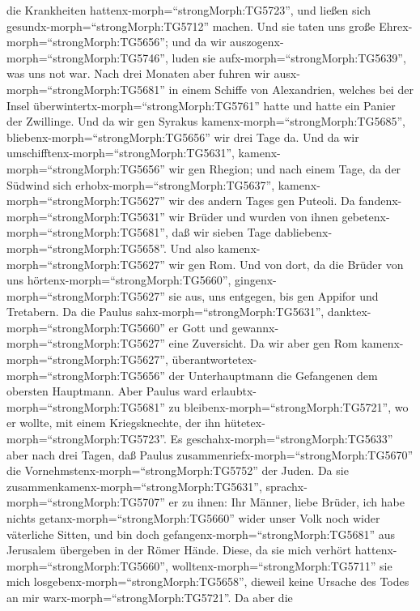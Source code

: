 die Krankheiten hattenx-morph=``strongMorph:TG5723'', und ließen sich
gesundx-morph=``strongMorph:TG5712'' machen.  Und sie taten
uns große Ehrex-morph=``strongMorph:TG5656''; und da wir
auszogenx-morph=``strongMorph:TG5746'', luden sie
aufx-morph=``strongMorph:TG5639'', was uns not war.  Nach
drei Monaten aber fuhren wir ausx-morph=``strongMorph:TG5681'' in einem
Schiffe von Alexandrien, welches bei der Insel
überwintertx-morph=``strongMorph:TG5761'' hatte und hatte ein Panier der
Zwillinge.  Und da wir gen Syrakus
kamenx-morph=``strongMorph:TG5685'',
bliebenx-morph=``strongMorph:TG5656'' wir drei Tage da. 
Und da wir umschifftenx-morph=``strongMorph:TG5631'',
kamenx-morph=``strongMorph:TG5656'' wir gen Rhegion; und nach einem
Tage, da der Südwind sich erhobx-morph=``strongMorph:TG5637'',
kamenx-morph=``strongMorph:TG5627'' wir des andern Tages gen Puteoli.
 Da fandenx-morph=``strongMorph:TG5631'' wir Brüder und
wurden von ihnen gebetenx-morph=``strongMorph:TG5681'', daß wir sieben
Tage dabliebenx-morph=``strongMorph:TG5658''. Und also
kamenx-morph=``strongMorph:TG5627'' wir gen Rom.  Und von
dort, da die Brüder von uns hörtenx-morph=``strongMorph:TG5660'',
gingenx-morph=``strongMorph:TG5627'' sie aus, uns entgegen, bis gen
Appifor und Tretabern. Da die Paulus sahx-morph=``strongMorph:TG5631'',
danktex-morph=``strongMorph:TG5660'' er Gott und
gewannx-morph=``strongMorph:TG5627'' eine Zuversicht.  Da
wir aber gen Rom kamenx-morph=``strongMorph:TG5627'',
überantwortetex-morph=``strongMorph:TG5656'' der Unterhauptmann die
Gefangenen dem obersten Hauptmann. Aber Paulus ward
erlaubtx-morph=``strongMorph:TG5681'' zu
bleibenx-morph=``strongMorph:TG5721'', wo er wollte, mit einem
Kriegsknechte, der ihn hütetex-morph=``strongMorph:TG5723''.
 Es geschahx-morph=``strongMorph:TG5633'' aber nach drei
Tagen, daß Paulus zusammenriefx-morph=``strongMorph:TG5670'' die
Vornehmstenx-morph=``strongMorph:TG5752'' der Juden. Da sie
zusammenkamenx-morph=``strongMorph:TG5631'',
sprachx-morph=``strongMorph:TG5707'' er zu ihnen: Ihr Männer, liebe
Brüder, ich habe nichts getanx-morph=``strongMorph:TG5660'' wider unser
Volk noch wider väterliche Sitten, und bin doch
gefangenx-morph=``strongMorph:TG5681'' aus Jerusalem übergeben in der
Römer Hände.  Diese, da sie mich verhört
hattenx-morph=``strongMorph:TG5660'',
wolltenx-morph=``strongMorph:TG5711'' sie mich
losgebenx-morph=``strongMorph:TG5658'', dieweil keine Ursache des Todes
an mir warx-morph=``strongMorph:TG5721''.  Da aber die
